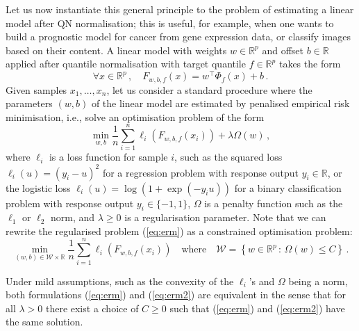 \documentclass{article}
\newcommand{\RR}{\mathbb{R}} %
\newcommand{\Wcal}{\mathcal{W}}
\begin{document}
Let us now instantiate this general principle to the problem of estimating a linear model after QN normalisation; this is useful, for example, when one wants to build a prognostic model for cancer from gene expression data, or classify images based on their content. A linear model with weights $w \in \RR^p$ and offset $b\in\RR$ applied after quantile normalisation with target quantile $f\in\RR^p$ takes the form
\begin{equation}\label{eq:lm}
\forall x\in\RR^p\,,\quad F_{w,b,f}(x) = w^\top \Phi_f(x) + b\,.
\end{equation}
Given samples $x_1,\ldots,x_n$, let us consider a standard procedure where the parameters $(w,b)$ of the linear model are estimated by penalised empirical risk minimisation, i.e., solve an optimisation problem of the form
\begin{equation}\label{eq:erm}
\min_{w,b} \frac{1}{n} \sum_{i=1}^n \ell_i\left(F_{w,b,f}(x_i)\right) + \lambda \Omega(w)\,,
\end{equation}
where $\ell_i$ is a loss function for sample $i$, such as the squared loss $\ell_i(u)=(y_i-u)^2$ for a regression problem with response output $y_i\in\RR$, or the logistic loss $\ell_i(u) = \log\left(1+\exp(-y_i u )\right)$ for a binary classification problem with response output $y_i\in\{-1,1\}$, $\Omega$ is a penalty function such as the $\ell_1$ or $\ell_2$ norm, and $\lambda\geq 0$ is a regularisation parameter. Note that we can rewrite the regularised problem (\ref{eq:erm}) as a constrained optimisation problem:
\begin{equation}\label{eq:erm2}
\min_{(w,b)\in\Wcal\times\RR} \frac{1}{n} \sum_{i=1}^n \ell_i\left(F_{w,b,f}(x_i)\right) \quad\text{where} \quad \Wcal = \left\{ w \in\RR^p\,:\, \Omega(w) \leq C\right\} \,.
\end{equation}

Under mild assumptions, such as the convexity of the $\ell_i$'s and $\Omega$ being a norm, both formulations (\ref{eq:erm}) and (\ref{eq:erm2}) are equivalent in the sense that for all $\lambda>0$ there exist a choice of $C\geq 0$ such that (\ref{eq:erm}) and (\ref{eq:erm2}) have the same solution.
\end{document}
